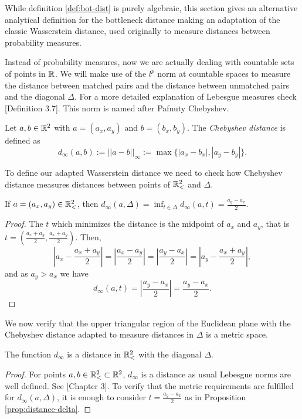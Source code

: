 While definition \ref{def:bot-dist} is purely algebraic, this section gives an alternative analytical definition for the bottleneck distance making an adaptation of the classic Wasserstein distance, used originally to measure distances between probability measures.

Instead of probability measures, now we are actually dealing with countable sets of points in $ \mathbb R $. We will make use of the $ l^p $ norm at countable spaces to measure the distance between matched pairs and the distance between unmatched pairs and the diagonal $ \Delta $. For a more detailed explanation of Lebesgue measures check \cite{rudin}[Definition 3.7]. This norm is named after Pafnuty Chebyshev.

\begin{definition}
    Let $ a, b \in \mathbb R^2 $ with $a = (a_x, a_y) $ and $ b = (b_x, b_y) $. The {\it Chebyshev distance} is defined as
    \begin{equation}
        d_\infty(a, b) := ||a-b||_{\infty} := \max \{|a_x - b_x|, |a_y - b_y|\}.
    \end{equation}
\end{definition}

To define our adapted Wasserstein distance we need to check how Chebyshev distance measures distances between points of $ \mathbb{R}_<^2 $ and $ \Delta $.

\begin{proposition} \label{prop:distance-delta}
    If $ a = (a_x, a_y) \in \mathbb{R}_<^2 $, then $ d_\infty(a, \Delta) = \inf_{t \in \Delta} d_\infty(a, t) = \frac{a_y - a_x}{2} $.
\end{proposition}
\begin{proof}
    The $ t $ which minimizes the distance is the midpoint of $ a_x $ and $ a_y $, that is $t = \left(\frac{a_x+a_y}{2}, \frac{a_x+a_y}{2}\right)  $. Then,
    \begin{equation}
        \left| a_x - \frac{a_x+a_y}{2} \right| = \left| \frac{a_x-a_y}{2}\right| = \left| \frac{a_y-a_x}{2}\right| = \left| a_y - \frac{a_x+a_y}{2} \right|,
    \end{equation}
    and as $ a_y > a_x $ we have
    \begin{equation}
        d_\infty(a, t) = \left|\frac{a_y - a_x}{2}\right| = \frac{a_y - a_x}{2}.
    \end{equation}
\end{proof}

We now verify that the upper triangular region of the Euclidean plane with the Chebyshev distance adapted to measure distances in $ \Delta $ is a metric space.
\begin{proposition}
    The function $ d_\infty $ is a distance in $ \mathbb{R}_<^2 $ with the diagonal $ \Delta $.
\end{proposition}
\begin{proof}
    For points $ a, b \in \mathbb{R}_<^2 \subset \mathbb R^2 $, $ d_\infty $ is a distance as usual Lebesgue norms are well defined. See \cite{rudin}[Chapter 3]. To verify that the metric requirements are fulfilled for $ d_\infty(a, \Delta) $, it is enough to consider $ t = \frac{a_y - a_x}{2} $ as in Proposition \ref{prop:distance-delta}.
\end{proof}


